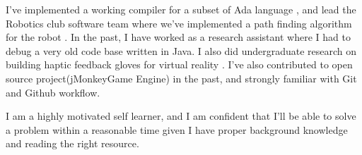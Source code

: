 \documentclass{article}
\begin{document}
I've implemented a working compiler for a subset of Ada language \cite{quazi_2021}, and lead the Robotics club software team where we've implemented a path finding algorithm for the robot \cite{irfan}. In the past, I have worked as a research assistant where I had to debug a very old code base written in Java. I also did undergraduate research on building haptic feedback gloves for virtual reality \cite{irfan2018building}. I've also contributed to open source project(jMonkeyGame Engine) in the past, and strongly familiar with Git and Github workflow.

I am a highly motivated self learner, and I am confident that I'll be able to solve a problem within a reasonable time given I have proper background knowledge and reading the right resource.

\pagebreak
\printbibliography
\end{document}
